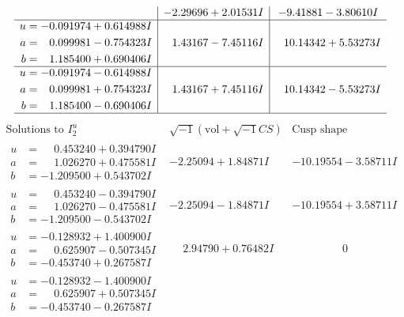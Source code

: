 \documentclass[1p]{elsarticle_modified}
\theoremstyle{definition}
\newcommand{\I}{\sqrt{-1}}
\begin{document}
$$\begin{array}{c|c|c}
 & -2.29696 + 2.01531 I & -9.41881 - 3.80610 I \\ \hline\begin{aligned}
u &= -0.091974 + 0.614988 I \\
a &= \phantom{-}0.099981 - 0.754323 I \\
b &= \phantom{-}1.185400 + 0.690406 I\end{aligned}
 & \phantom{-}1.43167 - 7.45116 I & \phantom{-}10.14342 + 5.53273 I \\ \hline\begin{aligned}
u &= -0.091974 - 0.614988 I \\
a &= \phantom{-}0.099981 + 0.754323 I \\
b &= \phantom{-}1.185400 - 0.690406 I\end{aligned}
 & \phantom{-}1.43167 + 7.45116 I & \phantom{-}10.14342 - 5.53273 I\\
 \hline 
 \end{array}$$\newpage$$\begin{array}{c|c|c}  
\text{Solutions to }I^u_{2}& \I (\text{vol} + \sqrt{-1}CS) & \text{Cusp shape}\\
 \hline 
\begin{aligned}
u &= \phantom{-}0.453240 + 0.394790 I \\
a &= \phantom{-}1.026270 + 0.475581 I \\
b &= -1.209500 + 0.543702 I\end{aligned}
 & -2.25094 + 1.84871 I & -10.19554 - 3.58711 I \\ \hline\begin{aligned}
u &= \phantom{-}0.453240 - 0.394790 I \\
a &= \phantom{-}1.026270 - 0.475581 I \\
b &= -1.209500 - 0.543702 I\end{aligned}
 & -2.25094 - 1.84871 I & -10.19554 + 3.58711 I \\ \hline\begin{aligned}
u &= -0.128932 + 1.400900 I \\
a &= \phantom{-}0.625907 - 0.507345 I \\
b &= -0.453740 + 0.267587 I\end{aligned}
 & \phantom{-}2.94790 + 0.76482 I & \phantom{-0.000000 } 0 \\ \hline\begin{aligned}
u &= -0.128932 - 1.400900 I \\
a &= \phantom{-}0.625907 + 0.507345 I \\
b &= -0.453740 - 0.267587 I\end{aligned}

\end{array}$$
\end{document}
